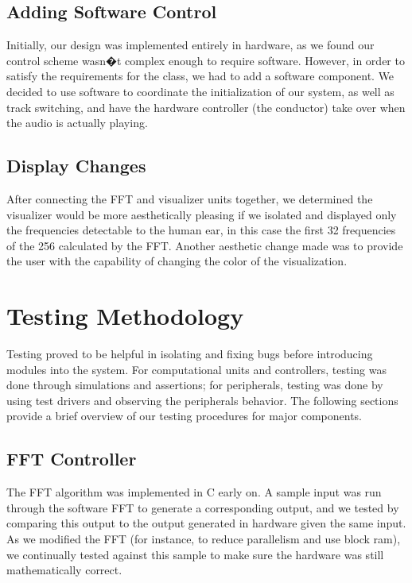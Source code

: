 \documentclass{article}
\begin{document}
\subsection{Adding Software Control}

Initially, our design was implemented entirely in hardware, as we found our control 
scheme wasn�t complex enough to require software. However, in order to satisfy the 
requirements for the class, we had to add a software component. We decided to use 
software to coordinate the initialization of our system, as well as track switching, and 
have the hardware controller (the conductor) take over when the audio is actually 
playing. 

\subsection{Display Changes}

After connecting the FFT and visualizer units together, we determined the visualizer 
would be more aesthetically pleasing if we isolated and displayed only the 
frequencies detectable to the human ear, in this case the first 32 frequencies of the 
256 calculated by the FFT.  Another aesthetic change made was to provide the user 
with the capability of changing the color of the visualization.

\section{Testing Methodology}

Testing proved to be helpful in isolating and fixing bugs before introducing
modules into the system. For computational units and controllers, testing was
done through simulations and assertions; for peripherals, testing was done by
using test drivers and observing the peripherals behavior. The following
sections provide a brief overview of our testing procedures for major
components.

\subsection{FFT Controller}

The FFT algorithm was implemented in C early on. A sample input was run through
the software FFT to generate a corresponding output, and we tested by comparing
this output to the output generated in hardware given the same input. As we
modified the FFT (for instance, to reduce parallelism and use block ram), we
continually tested against this sample to make sure the hardware was still
mathematically correct.
\end{document}
